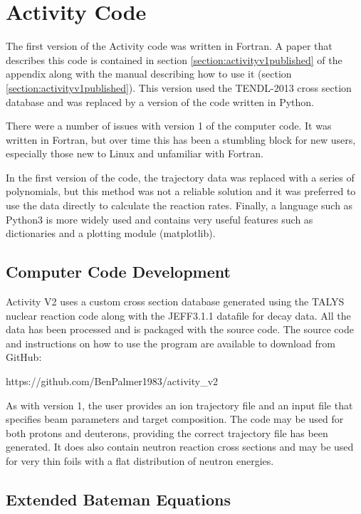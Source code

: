 \FloatBarrier
\section{Activity Code}

The first version of the Activity code was written in Fortran.  A paper that describes this code is contained in section \ref{section:activityv1published} of the appendix along with the manual describing how to use it (section \ref{section:activityv1published}).  This version used the TENDL-2013 cross section database and was replaced by a version of the code written in Python.

There were a number of issues with version 1 of the computer code.  It was written in Fortran, but over time this has been a stumbling block for new users, especially those new to Linux and unfamiliar with Fortran. 

In the first version of the code, the trajectory data was replaced with a series of polynomials, but this method was not a reliable solution and it was preferred to use the data directly to calculate the reaction rates.  Finally, a language such as Python3 is more widely used and contains very useful features such as dictionaries and a plotting module (matplotlib).


\subsection{Computer Code Development}

Activity V2 uses a custom cross section database generated using the TALYS nuclear reaction code along with the JEFF3.1.1 datafile for decay data.  All the data has been processed and is packaged with the source code.  The source code and instructions on how to use the program are available to download from GitHub: 

https://github.com/BenPalmer1983/activity\_v2

As with version 1, the user provides an ion trajectory file and an input file that specifies beam parameters and target composition.  The code may be used for both protons and deuterons, providing the correct trajectory file has been generated.  It does also contain neutron reaction cross sections and may be used for very thin foils with a flat distribution of neutron energies.




\subsection{Extended Bateman Equations}

